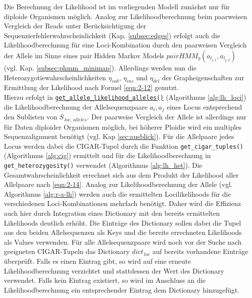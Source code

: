 Die Berechnung der Likelihood ist im vorliegenden Modell zunächst nur für diploide Organismen möglich. Analog zur Likelihoodberechnung beim paarweisen Vergleich der Reads unter Berücksichtigung der Sequenzierfehlerwahrscheinlichkeit (Kap. \ref{subsec:edges}) erfolgt auch die Likelihoodberechnung für eine Loci-Kombination durch den paarweisen Vergleich der Allele im Sinne eines pair Hidden Markov Models $ pairHMM_{\eta}(a_{l_{j,1}}, a_{l_{j,2}}) $ (vgl. Kap. \ref{subsec:phmm_minimap}). Allerdings werden nun die Heterozygotiewahrscheinlichkeiten $\eta_{sub}$, $\eta_{ins}$ und $\eta_{del}$ der Grapheigenschaften zur Ermittlung der Likelihood nach Formel \eqref{eqn:2-12} genutzt.  \\

Hierzu erfolgt in \hyperref[schritt16]{\lstinline|get_allele_likelihood_alleles()|\label{schritt16txt}} (Algorithmus \ref{alg:lh_loci}) die Likelihoodberechnung der Allelsequenzpaare ${a_{i}, a_{j}}$ eines Locus entsprechend den Sublisten von \linebreak $S_{\,loc,\, alleles}$. Der paarweise Vergleich der Allele ist allerdings nur für Daten diploider Organismen möglich, bei höherer Ploidie wird ein multiples Sequenzalignment benötigt (vgl. Kap \ref{sec:ausblick}). Für die Allelpaare jedes Locus werden dabei die CIGAR-Tupel durch die Funktion \lstinline|get_cigar_tuples()| (Algorithmus \ref{alg:cig}) ermittelt und für die Likelihoodberechnung in \lstinline|get_heterozygosity()| verwendet (Algorithmus \ref{alg:lh_het}). Die Gesamtwahrscheinlichkeit errechnet sich aus dem Produkt der Likelihood aller Allelpaare nach \ref{eqn:2-14}. Analog zur Likelihoodberechnung der Allele (vgl. Algorithmus \ref{alg:r-a-lh}) werden auch die ermittelten Locilikelihoods für die verschiedenen Loci-Kombinationen mehrfach benötigt. Daher wird die Effizienz auch hier durch Integration eines Dictionary mit den bereits ermittelten Likelihoods deutlich erhöht. Die Einträge des Dictionary sollen dabei die Tupel aus den beiden Allelsequenzen als Keys und die bereits errechneten Likelihoods als Values verwenden. Für alle Allelsequenzpaare wird noch vor der Suche nach geeigneten CIGAR-Tupeln das Dictionary $ dict_{\,loc} $ auf bereits vorhandene Einträge überprüft.  Falls es einen Eintrag gibt, so wird auf eine erneute Likelihoodberechnung verzichtet und stattdessen der Wert des Dictionary verwendet. Falls kein Eintrag existiert, so wird im Anschluss an die Likelihoodberechnung ein entsprechender Eintrag dem Dictionary hinzugefügt.
\newpage

